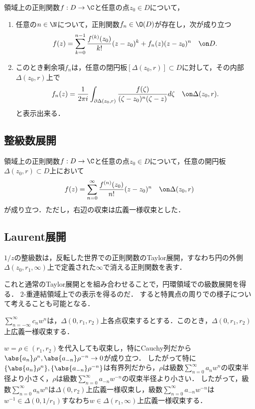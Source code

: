 \documentclass[uplatex, dvipdfmx]{jsreport}
\begin{document}
\begin{theorem}[Taylorの定理]
    領域上の正則関数$f:D\to\C$と任意の点$z_0\in D$について，
    \begin{enumerate}
        \item 任意の$n\in\N$について，正則関数$f_n\in\O(D)$が存在し，次が成り立つ
        \[f(z)=\sum^{n-1}_{k=0}\frac{f^{(k)}(z_0)}{k!}(z-z_0)^k+f_n(z)(z-z_0)^n\quad\on D.\]
        \item このとき剰余項$f_n$は，任意の閉円板$[\Delta(z_0,r)]\subset D$に対して，その内部$\Delta(z_0,r)$上で
        \[f_n(z)=\frac{1}{2\pi i}\int_{\partial\Delta(z_0,r)}\frac{f(\zeta)}{(\zeta-z_0)^n(\zeta-z)}d\zeta\quad\on\Delta(z_0,r).\]
        と表示出来る．
    \end{enumerate}
\end{theorem}

\subsection{整級数展開}

\begin{corollary}
    領域上の正則関数$f:D\to\C$と任意の点$z_0\in D$について，任意の開円板$\Delta(z_0,r)\subset D$上において
    \[f(z)=\sum^\infty_{n=0}\frac{f^{(n)}(z_0)}{n!}(z-z_0)^n\quad\on\Delta(z_0,r)\]
    が成り立つ．ただし，右辺の収束は広義一様収束とした．
\end{corollary}

\subsection{Laurent展開}

\begin{tcolorbox}[colframe=ForestGreen, colback=ForestGreen!10!white,breakable,colbacktitle=ForestGreen!40!white,coltitle=black,fonttitle=\bfseries\sffamily,
title=穴の空いた領域への対応]
    $1/z$の整級数は，反転した世界での正則関数のTaylor展開，すなわち円の外側$\Delta(z_0,r_1,\infty)$上で定義された$\infty$で消える正則関数を表す．
    
    これと通常のTaylor展開とを組み合わせることで，円環領域での級数展開を得る．
    $2$-重連結領域上での表示を得るのだ．
    すると特異点の周りでの様子について考えることも可能となる．
\end{tcolorbox}

\begin{lemma}[主要部の収束半径]
    $\sum_{n=-\infty}^\infty c_nw^n$は，$\Delta(0,r_1,r_2)$上各点収束するとする．このとき，$\Delta(0,r_1,r_2)$上広義一様収束する．
\end{lemma}
\begin{Proof}
    $w=\rho\in(r_1,r_2)$を代入しても収束し，特にCauchy列だから$\abs{a_n}\rho^n,\abs{a_{-n}}\rho^{-n}\to 0$が成り立つ．
    したがって特に$\{\abs{a_n}\rho^n\},\{\abs{a_{-n}}\rho^{-n}\}$は有界列だから，$\rho$は級数$\sum^\infty_{n=0}a_nw^n$の収束半径より小さく，$\rho$は級数$\sum^\infty_{n=0}a_{-n}w^{-n}$の収束半径より小さい．
    したがって，級数$\sum^\infty_{n=0}a_nw^n$は$\Delta(0,r_2)$上広義一様収束し，級数$\sum^\infty_{n=0}a_{-n}w^{-n}$は$w^{-1}\in\Delta(0,1/r_1)$すなわち$w\in\Delta(r_1,\infty)$上広義一様収束する．
\end{Proof}
\end{document}
